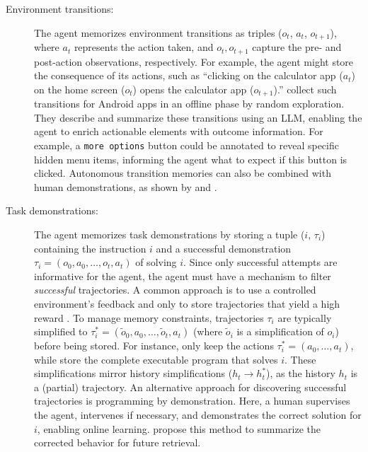 \begin{description}
    \item[Environment transitions:] 
        The agent memorizes environment transitions as triples ($o_t$, $a_t$, $o_{t+1}$), where $a_t$ represents the action taken, and $o_t,o_{t+1}$ capture the pre- and post-action observations, respectively. For example, the agent might store the consequence of its actions, such as ``clicking on the calculator app ($a_t$) on the home screen ($o_t$) opens the calculator app ($o_{t+1}$).'' \citet{wen_autodroid_2024} collect such transitions for Android apps in an offline phase by random exploration. They describe and summarize these transitions using an LLM, enabling the agent to enrich actionable elements with outcome information. For example, a \texttt{more options} button could be annotated to reveal specific hidden menu items, informing the agent what to expect if this button is clicked. Autonomous transition memories can also be combined with human demonstrations, as shown by \citet{zhang_appagent_2023} and \citet{li_appagent_2024}.
    \item[Task demonstrations:] 
        The agent memorizes task demonstrations by storing a tuple ($i$, $\tau_i$) containing the instruction $i$ and a successful demonstration $\tau_i=(o_{0},a_{0},\hdots,o_{t},a_{t})$ of solving $i$. Since only successful attempts are informative for the agent, the agent must have a mechanism to filter \emph{successful} trajectories. 
        A common approach is to use a controlled environment's feedback and only to store trajectories that yield a high reward .
        To manage memory constraints, trajectories $\tau_i$ are typically simplified to $\tau_i^*=(\tilde{o}_0,a_0,\hdots,\tilde{o}_t,a_t)$ (where $\tilde{o}_i$ is a simplification of $o_i$) before being stored. 
        For instance, \citet{deng_multi-turn_2024} only keep the actions $\tau_i^*=(a_0,\hdots,a_t)$, while \citet{sun_adaplanner_2023} store the complete executable program that solves $i$.
        These simplifications mirror history simplifications ($h_t \rightarrow h_t^*$), as the history $h_t$ is a (partial) trajectory.
        An alternative approach for discovering successful trajectories is programming by demonstration. Here, a human supervises the agent, intervenes if necessary, and demonstrates the correct solution for $i$, enabling online learning. \citet{song_visiontasker_2024} propose this method to summarize the corrected behavior for future retrieval.
\end{description}

